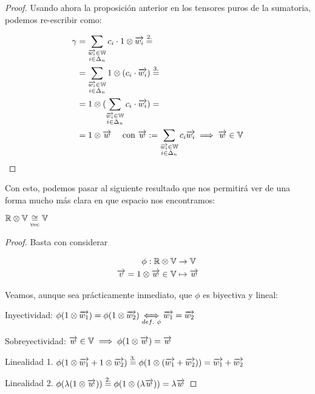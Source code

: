 \begin{ejemplo}
\begin{proof}
        Usando ahora la proposición anterior en los tensores puros de la sumatoria, podemos re-escribir como:

        \begin{equation}
        \begin{split}
            \gamma &= \sum_{\substack{\overrightarrow{w_i} \in \mathbb{W}\\ i \in \Delta_{n}}} c_{i} \cdot 1 \otimes \overrightarrow{w_i} \stackrel{\text{2.}}{=} \\
            & = \sum_{\substack{\overrightarrow{w_i} \in \mathbb{W}\\ i \in \Delta_{n}}} 1 \otimes (c_{i} \cdot \overrightarrow{w_i}) \stackrel{\text{3.}}{=} \\
            & = 1 \otimes ( \sum_{\substack{\overrightarrow{w_i} \in \mathbb{W} \\ i \in \Delta_{n}}} c_{i} \cdot \overrightarrow{w_i} ) = \\
            & = 1 \otimes \overrightarrow{w} \ \ \ \  \text{con } \overrightarrow{w} := \sum_{\substack{\overrightarrow{w_i} \in \mathbb{W}\\ i \in \Delta_{n}}} c_{i} \overrightarrow{w_i} \implies \overrightarrow{w} \in \mathbb{V}
        \end{split}
        \end{equation}

    \end{proof}


    Con esto, podemos pasar al siguiente resultado que nos permitirá ver de una forma mucho más clara en que espacio nos encontramos:

    \begin{proposicion}
        $\mathbb{R} \otimes \mathbb{V} \underset{\text{vec}}{\cong} \mathbb{V}$
    \end{proposicion}
    \begin{proof}
        Basta con considerar

        \begin{equation}
        \begin{split}
            \phi: \mathbb{R} \otimes \mathbb{V} &\to \mathbb{V} \\
            \overrightarrow{v} = 1 \otimes \overrightarrow{w} \in \mathbb{V} &\mapsto \overrightarrow{w}
        \end{split}
        \end{equation}

        Veamos, aunque sea prácticamente inmediato, que $\phi$ es biyectiva y lineal:

        Inyectividad: $\phi(1 \otimes \overrightarrow{w_1}) = \phi(1 \otimes \overrightarrow{w_2}) \underset{def.\ \phi}{\Longleftrightarrow} \overrightarrow{w_1} = \overrightarrow{w_2}$

        Sobreyectividad: $\overrightarrow{w} \in \mathbb{V} \implies \phi(1 \otimes \overrightarrow{w}) = \overrightarrow{w}$

        Linealidad 1. $\phi(1 \otimes \overrightarrow{w_1} + 1 \otimes \overrightarrow{w_2}) \stackrel{\text{3.}}{=} \phi(1 \otimes (\overrightarrow{w_1} + \overrightarrow{w_2})) = \overrightarrow{w_1} + \overrightarrow{w_2}$

        Linealidad 2. $\phi(\lambda (1 \otimes \overrightarrow{w})) \stackrel{\text{2.}}{=} \phi(1 \otimes (\lambda \overrightarrow{w})) = \lambda \overrightarrow{w}$

    \end{proof}
\end{ejemplo}

